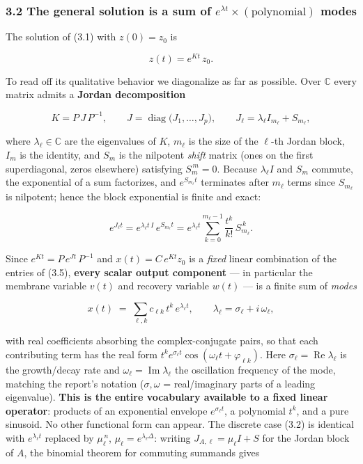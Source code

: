\documentclass[
  11pt,
]{article}
\begin{document}
\subsubsection{\texorpdfstring{3.2 The general solution is a sum of
\(e^{\lambda t}\times(\text{polynomial})\)
modes}{3.2 The general solution is a sum of e\^{}\{\textbackslash lambda t\}\textbackslash times(\textbackslash text\{polynomial\}) modes}}\label{the-general-solution-is-a-sum-of-elambda-ttimestextpolynomial-modes}

The solution of (3.1) with \(z(0)=z_0\) is

\[
z(t) = e^{Kt}\,z_0 .
\tag{3.3}
\]

To read off its qualitative behavior we diagonalize as far as possible.
Over \(\mathbb{C}\) every matrix admits a \textbf{Jordan decomposition}

\[
K = P\,J\,P^{-1},\qquad
J = \operatorname{diag}\!\big(J_1,\dots,J_p\big),\qquad
J_\ell = \lambda_\ell I_{m_\ell} + S_{m_\ell},
\tag{3.4}
\]

where \(\lambda_\ell\in\mathbb{C}\) are the eigenvalues of \(K\),
\(m_\ell\) is the size of the \(\ell\)-th Jordan block, \(I_{m}\) is the
identity, and \(S_m\) is the nilpotent \emph{shift} matrix (ones on the
first superdiagonal, zeros elsewhere) satisfying \(S_m^{\,m}=0\).
Because \(\lambda_\ell I\) and \(S_m\) commute, the exponential of a sum
factorizes, and \(e^{S_{m_\ell}t}\) terminates after \(m_\ell\) terms
since \(S_{m_\ell}\) is nilpotent; hence the block exponential is finite
and exact:

\[
e^{J_\ell t}
= e^{\lambda_\ell t\,I}\,e^{S_{m_\ell}t}
= e^{\lambda_\ell t}\sum_{k=0}^{m_\ell-1}\frac{t^{k}}{k!}\,S_{m_\ell}^{\,k}.
\tag{3.5}
\]

Since \(e^{Kt}=P\,e^{Jt}\,P^{-1}\) and \(x(t)=C\,e^{Kt}z_0\) is a
\emph{fixed} linear combination of the entries of (3.5), \textbf{every
scalar output component} --- in particular the membrane variable
\(v(t)\) and recovery variable \(w(t)\) --- is a finite sum of
\emph{modes}

\[
x(t) \;=\; \sum_{\ell,k} c_{\ell k}\, t^{k}\, e^{\lambda_\ell t},
\qquad
\lambda_\ell = \sigma_\ell + i\,\omega_\ell,
\tag{3.6}
\]

with real coefficients absorbing the complex-conjugate pairs, so that
each contributing term has the real form
\(t^{k}e^{\sigma_\ell t}\cos(\omega_\ell t+\varphi_{\ell k})\). Here
\(\sigma_\ell=\operatorname{Re}\lambda_\ell\) is the growth/decay rate
and \(\omega_\ell=\operatorname{Im}\lambda_\ell\) the oscillation
frequency of the mode, matching the report's notation (\(\sigma,\omega\)
= real/imaginary parts of a leading eigenvalue). \textbf{This is the
entire vocabulary available to a fixed linear operator}: products of an
exponential envelope \(e^{\sigma_\ell t}\), a polynomial \(t^k\), and a
pure sinusoid. No other functional form can appear. The discrete case
(3.2) is identical with \(e^{\lambda_\ell t}\) replaced by
\(\mu_\ell^{\,n}\), \(\mu_\ell=e^{\lambda_\ell\Delta}\): writing
\(J_{A,\ell}=\mu_\ell I+S\) for the Jordan block of \(A\), the binomial
theorem for commuting summands gives
\end{document}
